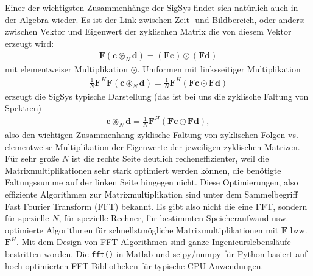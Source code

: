 Einer der wichtigsten Zusammenhänge der SigSys findet sich natürlich auch
in der Algebra wieder. Es ist der Link zwischen Zeit- und Bildbereich, oder
anders: zwischen Vektor und Eigenwert der zyklischen Matrix die von diesem
Vektor erzeugt wird:
\begin{align}
\bm{F}(\bm{c} \circledast_N \bm{d}) = (\bm{F}\bm{c})  \odot (\bm{F}\bm{d})
\end{align}
mit elementweiser Multiplikation $\odot$.
Umformen mit linksseitiger Multiplikation
\begin{align}
\frac{1}{N}
\bm{F}^H \bm{F}(\bm{c} \circledast_N \bm{d}) =\frac{1}{N}
\bm{F}^H \left( \bm{F}\bm{c}  \odot \bm{F}\bm{d} \right)
\end{align}
erzeugt die SigSys typische Darstellung (das ist bei uns die
zyklische Faltung von Spektren)
\begin{align}
\bm{c} \circledast_N \bm{d} =
\frac{1}{N} \bm{F}^H \left( \bm{F}\bm{c}  \odot \bm{F}\bm{d} \right),
\end{align}
also den wichtigen Zusammenhang zyklische Faltung von zyklischen Folgen vs.
elementweise Multiplikation der Eigenwerte der jeweiligen zyklischen Matrizen.
%
Für sehr große $N$ ist die rechte Seite deutlich recheneffizienter, weil
die Matrixmultiplikationen sehr stark optimiert werden können, die benötigte
Faltungssumme auf der linken Seite hingegen nicht.
%
Diese Optimierungen, also effiziente Algorithmen zur Matrixmultiplikation
sind unter dem Sammelbegriff Fast Fourier Transform (FFT) bekannt.
Es gibt also nicht die eine FFT, sondern für spezielle $N$, für
spezielle Rechner, für bestimmten Speicheraufwand usw.
optimierte Algorithmen für schnellstmögliche Matrixmultiplikationen mit
$\bm{F}$ bzw. $\bm{F}^H$. Mit dem Design von FFT Algorithmen sind ganze
Ingenieurslebensläufe bestritten worden. Die \texttt{fft()} in Matlab und
scipy/numpy für Python basiert auf hoch-optimierten FFT-Bibliotheken für
typische CPU-Anwendungen.
